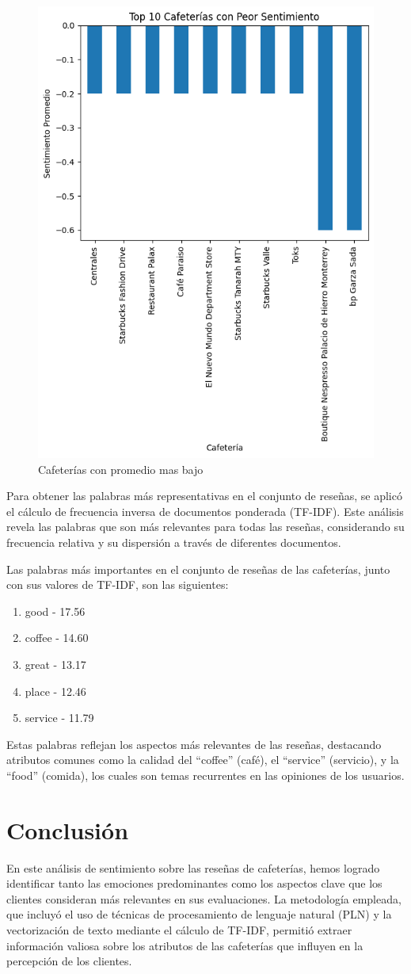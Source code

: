 \documentclass[journal]{IEEEtran}
\begin{document}
\begin{figure}
    \centering
    \includegraphics[width=0.5\linewidth]{Figs/peor10.png}
    \caption{Cafeterías con promedio mas bajo}
    \label{peor10}
\end{figure}
Para obtener las palabras más representativas en el conjunto de reseñas, se aplicó el cálculo de frecuencia inversa de documentos ponderada (TF-IDF). Este análisis revela las palabras que son más relevantes para todas las reseñas, considerando su frecuencia relativa y su dispersión a través de diferentes documentos.

Las palabras más importantes en el conjunto de reseñas de las cafeterías, junto con sus valores de TF-IDF, son las siguientes:
\begin{enumerate}
    \item good - 17.56
    \item coffee - 14.60
    \item great - 13.17
    \item place - 12.46
    \item service - 11.79
\end{enumerate}


Estas palabras reflejan los aspectos más relevantes de las reseñas, destacando atributos comunes como la calidad del “coffee” (café), el “service” (servicio), y la “food” (comida), los cuales son temas recurrentes en las opiniones de los usuarios.
\section{Conclusión}
En este análisis de sentimiento sobre las reseñas de cafeterías, hemos logrado identificar tanto las emociones predominantes como los aspectos clave que los clientes consideran más relevantes en sus evaluaciones. La metodología empleada, que incluyó el uso de técnicas de procesamiento de lenguaje natural (PLN) y la vectorización de texto mediante el cálculo de TF-IDF, permitió extraer información valiosa sobre los atributos de las cafeterías que influyen en la percepción de los clientes.
\end{document}
